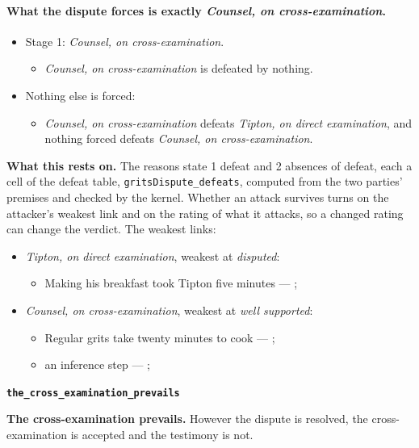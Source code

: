 \documentclass[11pt]{article}
\begin{document}
\paragraph{What the dispute forces is exactly \emph{Counsel, on cross-examination}.}
\begin{itemize}
\item Stage 1: \emph{Counsel, on cross-examination}.
\begin{itemize}
\item \emph{Counsel, on cross-examination} is defeated by nothing.
\end{itemize}
\item Nothing else is forced:
\begin{itemize}
\item \emph{Counsel, on cross-examination} defeats \emph{Tipton, on direct examination}, and nothing forced defeats \emph{Counsel, on cross-examination}.
\end{itemize}
\end{itemize}
\par\noindent\textbf{What this rests on.} The reasons state 1 defeat and 2 absences of defeat, each a cell of the defeat table, \texttt{grits\allowbreak{}Dispute\_\allowbreak{}defeats}, computed from the two parties' premises and checked by the kernel. Whether an attack survives turns on the attacker's weakest link and on the rating of what it attacks, so a changed rating can change the verdict. The weakest links:
\begin{itemize}
\item \emph{Tipton, on direct examination}, weakest at \emph{disputed}:
\begin{itemize}
\item Making his breakfast took Tipton five minutes --- \cite[11--12]{garland-novato-healthcare-2019}; \cite{launer-my-cousin-vinny-1992}
\end{itemize}
\item \emph{Counsel, on cross-examination}, weakest at \emph{well supported}:
\begin{itemize}
\item Regular grits take twenty minutes to cook --- \cite[11--12]{garland-novato-healthcare-2019}; \cite{launer-my-cousin-vinny-1992}
\item an inference step --- \cite[11--12]{garland-novato-healthcare-2019}; \cite{launer-my-cousin-vinny-1992}
\end{itemize}
\end{itemize}
\par\medskip\noindent\textbf{\texttt{the\_\allowbreak{}cross\_\allowbreak{}examination\_\allowbreak{}prevails}}\par\nobreak\noindent
\textbf{The cross-examination prevails.} However the dispute is resolved, the cross-examination is accepted and the testimony is not.
\end{document}
